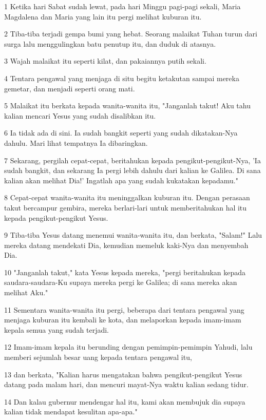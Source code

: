 \par 1 Ketika hari Sabat sudah lewat, pada hari Minggu pagi-pagi sekali, Maria Magdalena dan Maria yang lain itu pergi melihat kuburan itu.
\par 2 Tiba-tiba terjadi gempa bumi yang hebat. Seorang malaikat Tuhan turun dari surga lalu menggulingkan batu penutup itu, dan duduk di atasnya.
\par 3 Wajah malaikat itu seperti kilat, dan pakaiannya putih sekali.
\par 4 Tentara pengawal yang menjaga di situ begitu ketakutan sampai mereka gemetar, dan menjadi seperti orang mati.
\par 5 Malaikat itu berkata kepada wanita-wanita itu, "Janganlah takut! Aku tahu kalian mencari Yesus yang sudah disalibkan itu.
\par 6 Ia tidak ada di sini. Ia sudah bangkit seperti yang sudah dikatakan-Nya dahulu. Mari lihat tempatnya Ia dibaringkan.
\par 7 Sekarang, pergilah cepat-cepat, beritahukan kepada pengikut-pengikut-Nya, 'Ia sudah bangkit, dan sekarang Ia pergi lebih dahulu dari kalian ke Galilea. Di sana kalian akan melihat Dia!' Ingatlah apa yang sudah kukatakan kepadamu."
\par 8 Cepat-cepat wanita-wanita itu meninggalkan kuburan itu. Dengan perasaan takut bercampur gembira, mereka berlari-lari untuk memberitahukan hal itu kepada pengikut-pengikut Yesus.
\par 9 Tiba-tiba Yesus datang menemui wanita-wanita itu, dan berkata, "Salam!" Lalu mereka datang mendekati Dia, kemudian memeluk kaki-Nya dan menyembah Dia.
\par 10 "Janganlah takut," kata Yesus kepada mereka, "pergi beritahukan kepada saudara-saudara-Ku supaya mereka pergi ke Galilea; di sana mereka akan melihat Aku."
\par 11 Sementara wanita-wanita itu pergi, beberapa dari tentara pengawal yang menjaga kuburan itu kembali ke kota, dan melaporkan kepada imam-imam kepala semua yang sudah terjadi.
\par 12 Imam-imam kepala itu berunding dengan pemimpin-pemimpin Yahudi, lalu memberi sejumlah besar uang kepada tentara pengawal itu,
\par 13 dan berkata, "Kalian harus mengatakan bahwa pengikut-pengikut Yesus datang pada malam hari, dan mencuri mayat-Nya waktu kalian sedang tidur.
\par 14 Dan kalau gubernur mendengar hal itu, kami akan membujuk dia supaya kalian tidak mendapat kesulitan apa-apa."
